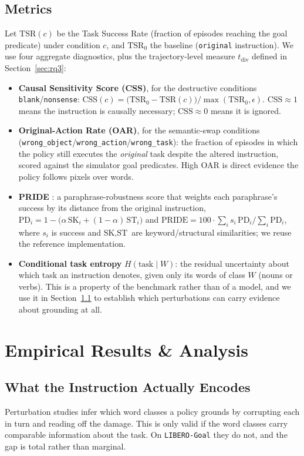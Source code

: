 \documentclass[11pt]{article}
\begin{document}
\subsection*{Metrics}
Let $\text{TSR}(c)$ be the Task Success Rate (fraction of episodes reaching the
goal predicate) under condition $c$, and $\text{TSR}_0$ the baseline
(\texttt{original} instruction). We use four aggregate diagnostics, plus the
trajectory-level measure $t_{\text{div}}$ defined in Section~\ref{sec:rq3}:
\begin{itemize}
\item \textbf{Causal Sensitivity Score (CSS)}, for the destructive conditions
  \texttt{blank}/\texttt{nonsense}:
  $\text{CSS}(c) = \big(\text{TSR}_0 - \text{TSR}(c)\big) / \max(\text{TSR}_0,\epsilon)$.
  $\text{CSS}\!\approx\!1$ means the instruction is causally necessary;
  $\text{CSS}\!\approx\!0$ means it is ignored.
\item \textbf{Original-Action Rate (OAR)}, for the semantic-swap conditions
  (\texttt{wrong\_object}/\texttt{wrong\_action}/\texttt{wrong\_task}): the fraction
  of episodes in which the policy still executes the \emph{original} task despite
  the altered instruction, scored against the simulator goal predicates. High OAR
  is direct evidence the policy follows pixels over words.
\item \textbf{PRIDE} \citep{kim2026liberopara}: a paraphrase-robustness score that
  weights each paraphrase's success by its distance from the original instruction,
  $\text{PD}_i = 1-\big(\alpha\, \text{SK}_i + (1-\alpha)\, \text{ST}_i\big)$ and
  $\text{PRIDE} = 100\cdot \sum_i s_i\,\text{PD}_i / \sum_i \text{PD}_i$, where
  $s_i$ is success and $\text{SK},\text{ST}$ are keyword/structural similarities;
  we reuse the reference implementation.
\item \textbf{Conditional task entropy} $H(\text{task}\mid W)$: the residual
  uncertainty about which task an instruction denotes, given only its words of
  class $W$ (nouns or verbs). This is a property of the benchmark rather than of a
  model, and we use it in Section~\ref{sec:info} to establish which perturbations
  can carry evidence about grounding at all.
\end{itemize}

\section{Empirical Results \& Analysis}

\subsection{What the Instruction Actually Encodes}
\label{sec:info}
Perturbation studies infer which word classes a policy grounds by corrupting each
in turn and reading off the damage. This is only valid if the word classes carry
comparable information about the task. On \texttt{LIBERO-Goal} they do not, and
the gap is total rather than marginal.
\end{document}
